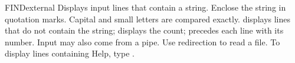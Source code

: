 \begin{DosEntry}{FIND}{}{external}
\Purpose Displays input lines that contain a string.
\Format {}
\Remarks
Enclose the string in quotation marks. Capital and small letters are
compared exactly.  displays lines that do not contain the string;
 displays the count;  precedes each line with its number.
Input may also come from a pipe. Use redirection to read a file.
\Example
To display lines containing Help, type .
\end{DosEntry}


